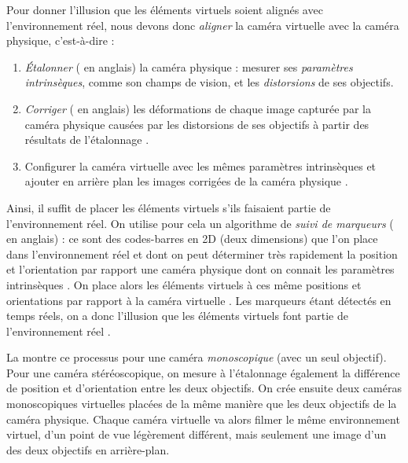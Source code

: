 Pour donner l'illusion que les éléments virtuels soient alignés avec l'environnement réel, nous devons donc \emph{aligner} la caméra virtuelle avec la caméra physique, c'est-à-dire :
\begin{enumerate}
  \item \emph{Étalonner} ( en anglais) la caméra physique : mesurer ses \emph{paramètres intrinsèques}, comme son champs de vision, et les \emph{distorsions} de ses objectifs.
  \item \emph{Corriger} ( en anglais) les déformations de chaque image capturée par la caméra physique causées par les distorsions de ses objectifs à partir des résultats de l'étalonnage .
  \item Configurer la caméra virtuelle avec les mêmes paramètres intrinsèques et ajouter en arrière plan les images corrigées de la caméra physique .
\end{enumerate}

Ainsi, il suffit de placer les éléments virtuels s'ils faisaient partie de l'environnement réel. On utilise pour cela un algorithme de \emph{suivi de marqueurs} ( en anglais) : ce sont des codes-barres en 2D (deux dimensions) que l'on place dans l'environnement réel  et dont on peut déterminer très rapidement la position et l'orientation par rapport une caméra physique dont on connait les paramètres intrinsèques \cite{Garrido-Jurado2014}. On place alors les éléments virtuels à ces même positions et orientations par rapport à la caméra virtuelle . Les marqueurs étant détectés en temps réels, on a donc l'illusion que les éléments virtuels font partie de l'environnement réel .

La  montre ce processus pour une caméra \emph{monoscopique} (avec un seul objectif). Pour une caméra stéréoscopique, on mesure à l'étalonnage également la différence de position et d'orientation entre les deux objectifs. On crée ensuite deux caméras monoscopiques virtuelles placées de la même manière que les deux objectifs de la caméra physique. Chaque caméra virtuelle va alors filmer le même environnement virtuel, d'un point de vue légèrement différent, mais seulement une image d'un des deux objectifs en arrière-plan.

